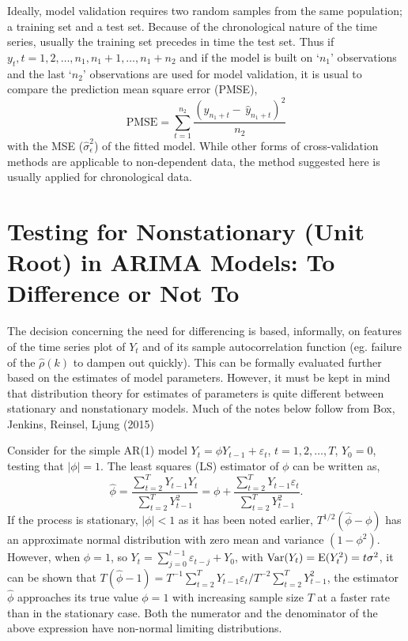 Ideally, model validation requires two random samples from the same population; a training set and a test set. Because of the chronological nature of the time series, usually the training set precedes in time the test set. Thus if $y_t, t= 1,2, \ldots,n_1, n_1+1, \ldots, n_1+n_2$ and if the model is built on `$n_1$' observations and the last `$n_2$' observations are used for model validation, it is usual to compare the prediction mean square error (PMSE),
	\begin{equation} \label{eqn:pmse}
	\text{PMSE} = \sum_{t=1}^{n_2} \frac{(y_{n_1+t} - \,\hat{y}_{n_1+t})^2}{n_2}
	\end{equation}
with the MSE ($\hat{\sigma}_\epsilon^2$) of the fitted model. While other forms of cross-validation methods are applicable to non-dependent data, the method suggested here is usually applied for chronological data.



\section{Testing for Nonstationary (Unit Root) in ARIMA Models: To Difference or Not To \label{sec:diffornot}} 


The decision concerning the need for differencing is based, informally, on features of the time series plot of $Y_t$ and of its sample autocorrelation function (eg. failure of the $\hat{\rho}(k)$ to dampen out quickly). This can be formally evaluated further based on the estimates of model parameters. However, it must be kept in mind that distribution theory for estimates of parameters is quite different between stationary and nonstationary models. Much of the notes below follow from Box, Jenkins, Reinsel, Ljung (2015)~\cite{ljung15}


Consider for the simple AR(1) model $Y_t = \phi Y_{t-1} + \varepsilon_t$, $t = 1,2, \ldots, T$, $Y_0 = 0$, testing that $|\phi| = 1$. The least squares (LS) estimator of $\phi$ can be written as,
	\begin{equation} \label{eqn:futurereffirst}
	\hat{\phi} = \dfrac{\sum_{t=2}^T Y_{t-1}Y_t}{\sum_{t=2}^T Y_{t-1}^2} = \phi + \dfrac{\sum_{t=2}^T Y_{t-1}\varepsilon_t}{\sum_{t=2}^T Y_{t-1}^2}.
	\end{equation}
If the process is stationary, $\lvert \phi \rvert< 1$ as it has been noted earlier, $T^{1/2}(\hat{\phi} - \phi)$ has an approximate normal distribution with zero mean and variance $(1 - \phi^2)$. However, when $\phi = 1$, so $Y_t = \sum_{j=0}^{t-1}\varepsilon_{t-j} + Y_0$, with $\operatorname{Var}(Y_t) = \operatorname{E}(Y_t^2) = t \sigma^2$, it can be shown that $T(\hat{\phi} - 1) = T^{-1} \sum_{t=2}^T Y_{t-1} \varepsilon_t/T^{-2} \sum_{t=2}^T Y_{t-1}^2$, the estimator $\hat{\phi}$ approaches its true value $\phi = 1$ with increasing sample size $T$ at a faster rate than in the stationary case. Both the numerator and the denominator of the above expression have non-normal limiting distributions. 


